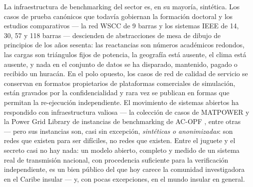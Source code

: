 La infraestructura de benchmarking del sector es, en su mayoría, sintética. Los casos de prueba canónicos que todavía gobiernan la formación doctoral y los estudios comparativos --- la red WSCC de 9 barras y los sistemas IEEE de 14, 30, 57 y 118 barras --- descienden de abstracciones de mesa de dibujo de principios de los años sesenta: las reactancias son números académicos redondos, las cargas son triángulos fijos de potencia, la geografía está ausente, el clima está ausente, y nada en el conjunto de datos se ha disparado, mantenido, pagado o recibido un huracán. En el polo opuesto, los casos de red de calidad de servicio se conservan en formatos propietarios de plataformas comerciales de simulación, están gravados por la confidencialidad y rara vez se publican en formas que permitan la re-ejecución independiente. El movimiento de sistemas abiertos ha respondido con infraestructura valiosa --- la colección de casos de MATPOWER \cite{matpower2011} y la Power Grid Library de instancias de benchmarking de AC-OPF \cite{pglib2019}, entre otras --- pero sus instancias son, casi sin excepción, \emph{sintéticas o anonimizadas}: son redes que existen para ser difíciles, no redes que existen. Entre el juguete y el secreto casi no hay nada: un modelo abierto, completo y medido de un sistema real de transmisión nacional, con procedencia suficiente para la verificación independiente, es un bien público del que hoy carece la comunidad investigadora en el Caribe insular --- y, con pocas excepciones, en el mundo insular en general.

